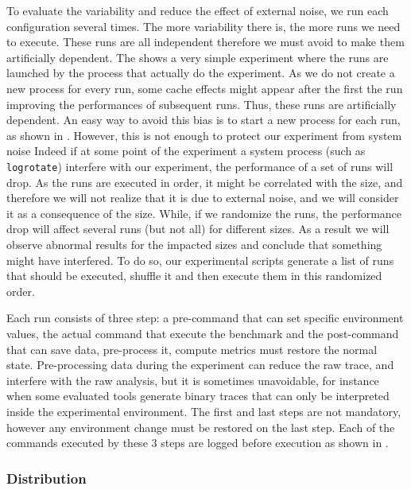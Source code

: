 To evaluate the variability and reduce the effect of external noise, we run each configuration several times.
The more variability there is, the more runs we need to execute.
These runs are all independent therefore we must avoid to make them artificially dependent.
The  shows a very simple experiment where the runs are launched by the process that actually do the experiment.
As we do not create a new process for every run, some cache effects might appear after the first the run improving the performances of subsequent runs.
Thus, these runs are artificially dependent.
An easy way to avoid this bias is to start a new process for each run, as shown in .
However, this is not enough to protect our experiment from system noise
Indeed if at some point of the experiment a system process (such as \texttt{logrotate}) interfere with our experiment, the performance of a set of runs will drop.
As the runs are executed in order, it might be correlated with the size, and therefore we will not realize that it is due to external noise, and we will consider it as a consequence of the size.
While, if we randomize the runs, the performance drop will affect several runs (but not all) for different sizes.
As a result we will observe abnormal results for the impacted sizes and conclude that something might have interfered.
To do so, our experimental scripts generate a list of runs that should be executed, shuffle it and then execute them in this randomized order.



Each run consists of three step: a pre-command that can set specific environment values, the actual command that execute the benchmark and the post-command that can save data, pre-process it, compute metrics must restore the normal state.
Pre-processing data during the experiment can reduce the raw trace, and interfere with the raw analysis, but it is sometimes unavoidable, for instance when some evaluated tools generate binary traces that can only be interpreted inside the experimental environment.
The first and last steps are not mandatory, however any environment change must be restored on the last step.
Each of the commands executed by these 3 steps are logged before execution as shown in .

\subsubsection{Distribution}

